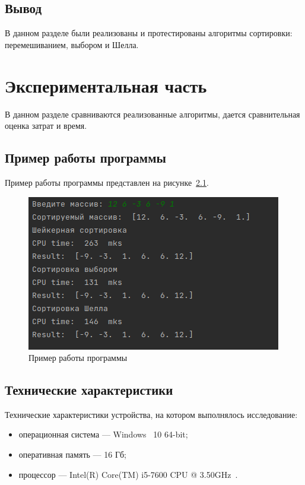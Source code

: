 \documentclass[12pt]{report}
\begin{document}
    \section{Вывод}
    В данном разделе были реализованы и протестированы алгоритмы сортировки: перемешиванием, выбором и Шелла.
    \newpage


    \chapter{Экспериментальная часть}
    В данном разделе сравниваются реализованные алгоритмы, дается сравнительная оценка затрат и время.


    \section{Пример работы программы}
    Пример работы программы представлен на рисунке~\ref{fig:work_example}.
    \captionsetup{singlelinecheck=true}
    \begin{figure}[H]
        \centering
        \includegraphics[width=0.7\linewidth]{img/example}
        \caption{Пример работы программы}
        \label{fig:work_example}
    \end{figure}


    \section{Технические характеристики}
    Технические характеристики устройства, на котором выполнялось исследование:
    \begin{itemize}
        \item операционная система --- Windows~\cite{windows} 10 64-bit;
        \item оперативная память --- 16 Гб;
        \item процессор --- Intel(R) Core(TM) i5-7600 CPU @ 3.50GHz~\cite{i5}.
    \end{itemize}
\end{document}
